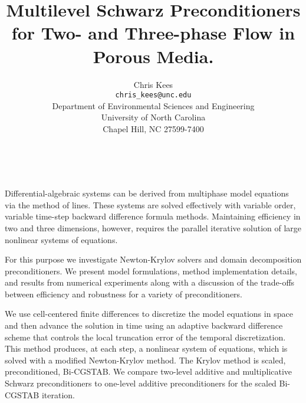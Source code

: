 \documentclass[11pt]{article}
\date{ ~ \hspace{-4mm}}
\title{Multilevel Schwarz Preconditioners for Two- and Three-phase Flow in Porous Media.  }
\author{Chris Kees \\ {\tt  chris\_kees@unc.edu} \\ Department of Environmental Sciences and Engineering  \\  University of North Carolina \\ Chapel Hill, NC 27599-7400}
\begin{document}
\maketitle
\thispagestyle{empty}





 



Differential-algebraic systems can be derived from multiphase model
equations via the method of lines. These systems are solved
effectively with variable order, variable time-step backward
difference formula methods.  Maintaining efficiency in two and three
dimensions, however, requires the parallel iterative solution of
large nonlinear systems of equations.

For this purpose we investigate Newton-Krylov solvers and domain
decomposition preconditioners. We present model formulations, method
implementation details, and results from numerical experiments along
with
a discussion of the trade-offs between efficiency and robustness for
a variety of preconditioners.

We use cell-centered finite differences to discretize the model
equations in space and then advance the solution in time using an
adaptive backward difference scheme that controls the local truncation
error of the temporal discretization. This method produces, at each
step, a nonlinear system of equations, which is solved with a modified
Newton-Krylov method. The Krylov method is scaled, preconditioned,
Bi-CGSTAB. We compare two-level additive and multiplicative Schwarz
preconditioners to one-level additive preconditioners for the scaled
Bi-CGSTAB iteration.
\end{document}
